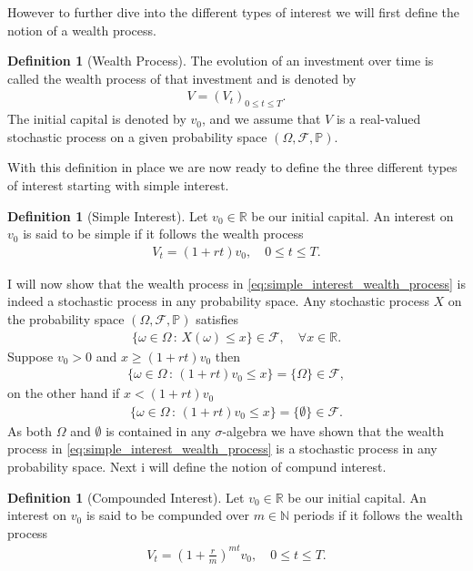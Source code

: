 \documentclass{article}
\theoremstyle{definition}
\newtheorem{definition}[theorem]{Definition}
\numberwithin{equation}{section}
\begin{document}
However to further dive into the different types of interest we will first define the notion of a wealth process.
\begin{definition}[Wealth Process]
    The evolution of an investment over time is called the wealth process of that investment and is denoted by
    \begin{align}
        V = (V_t)_{0 \leq t \leq T}.
    \end{align}
    The initial capital is denoted by $v_0$, and we assume that $V$ is a real-valued stochastic process on a given probability space $(\Omega, \mathcal{F}, \mathbb{P})$.
\end{definition}
With this definition in place we are now ready to define the three different types of interest starting with simple interest.
\begin{definition}[Simple Interest]
    Let $v_0 \in \mathbb{R}$ be our initial capital.
    An interest on $v_0$ is said to be simple if it follows the wealth process
    \begin{align}\label{eq:simple_interest_wealth_process}
        V_t = (1 + rt)v_0, \quad 0 \leq t \leq T.
    \end{align}
\end{definition}
I will now show that the wealth process in \eqref{eq:simple_interest_wealth_process} is indeed a stochastic process in any probability space.
Any stochastic process $X$ on the probability space $(\Omega, \mathcal{F}, \mathbb{P})$ satisfies
\begin{align}
    \{\omega \in \Omega \, : \, X(\omega) \leq x\} \in \mathcal{F}, \quad \forall x \in \mathbb{R}.
\end{align}
Suppose $v_0 > 0$ and $x \geq (1 + rt)v_0$ then
\begin{align}
    \{\omega \in \Omega \, : \, (1 + rt)v_0 \leq x\} = \{\Omega\} \in \mathcal{F},
\end{align}
on the other hand if $x < (1 + rt)v_0$
\begin{align}
    \{\omega \in \Omega \, : \, (1 + rt)v_0 \leq x\} = \{\emptyset\} \in \mathcal{F}.
\end{align}
As both $\Omega$ and $\emptyset$ is contained in any $\sigma$-algebra we have shown that the wealth process in \eqref{eq:simple_interest_wealth_process} is a stochastic process in any probability space.
Next i will define the notion of compund interest.
\begin{definition}[Compounded Interest]
    Let $v_0 \in \mathbb{R}$ be our initial capital.
    An interest on $v_0$ is said to be compunded over $m\in\mathbb{N}$ periods if it follows the wealth process
    \begin{align}\label{eq:compund_interest_wealth_process}
        V_t = \left( 1 + \frac{r}{m} \right)^{mt} v_0, \quad 0 \leq t \leq T.
    \end{align}
\end{definition}
\end{document}
